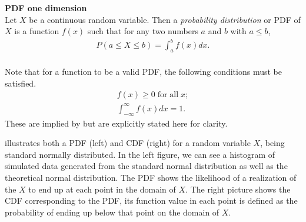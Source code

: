 \begin{definition}\label{def:PDF1d} \textbf{PDF one dimension} \\
    Let $X$ be a continuous random variable. Then a \emph{probability distribution} or \gls{PDF} of $X$ is a function $f(x)$ such that for any two numbers $a$ and $b$ with $a \leq  b$,
        \begin{align*}
            P(a \leq X \leq b) = \int_a^bf(x)dx.\\
        \end{align*}
\end{definition}
\begin{remark}\label{rem:pdfProperties}
    Note that for a function to be a valid \gls{PDF}, the following conditions must be satisfied. 
    \begin{align*}
        f(x) \geq 0 \; \mathrm{ for\; all \;} x;\\
        \int_{-\infty}^{\infty}f(x)dx = 1. 
    \end{align*}
    These are implied by  but are explicitly stated here for clarity. 
\end{remark}


 illustrates both a \gls{PDF} (left) and \gls{CDF} (right) for a random variable $X$, being standard normally distributed. In the left figure, we can see a histogram of simulated data generated from the standard normal distribution as well as the theoretical normal distribution. The \gls{PDF} shows the likelihood of a realization of the $X$ to end up at each point in the domain of $X$. The right picture shows the \gls{CDF} corresponding to the \gls{PDF}, its function value in each point is defined as the probability of ending up below that point on the domain of $X$.

